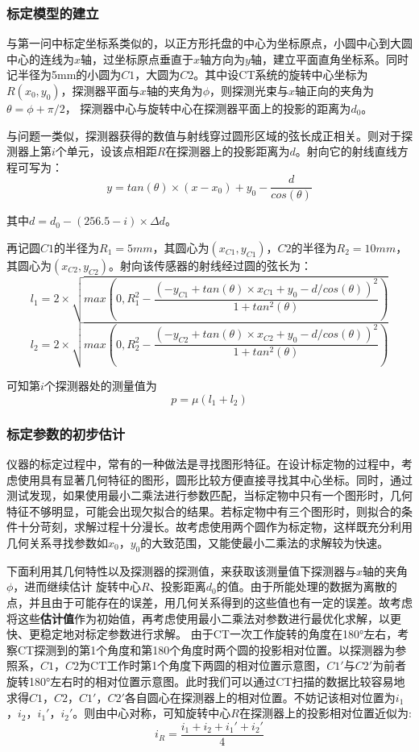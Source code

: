 \documentclass{myart}
\begin{document}

\subsubsection{标定模型的建立}
与第一问中标定坐标系类似的，以正方形托盘的中心为坐标原点，小圆中心到大圆中心的连线为\(x\)轴，过坐标原点垂直于\(x\)轴方向为\(y\)轴，建立平面直角坐标系。同时记半径为5mm的小圆为\(C1\)，大圆为\(C2\)。其中设CT系统的旋转中心坐标为\(R(x_0,y_0)\)，探测器平面与\(x\)轴的夹角为\(\phi\)，则探测光束与\(x\)轴正向的夹角为\( \theta = \phi + \pi /2 \)，  探测器中心与旋转中心在探测器平面上的投影的距离为\(d_0\)。

与问题一类似，探测器获得的数值与射线穿过圆形区域的弦长成正相关。则对于探测器上第\(i\)个单元，设该点相距\(R\)在探测器上的投影距离为\(d\)。射向它的射线直线方程可写为：
\[ y = tan(\theta) \times (x - x_0) + y_0 - \frac{d}{cos(\theta)} \]

其中\(d = d_0 - (256.5 - i) \times \Delta d \)。

再记圆\(C1\)的半径为\(R_1 = 5mm\)，其圆心为\( (x_{C1}, y_{C1} )\)，\(C2\)的半径为\(R_2 = 10mm\)，其圆心为\( (x_{C2}, y_{C2} )\)。射向该传感器的射线经过圆的弦长为：
\[ l_1 = 2\times \sqrt{max(0, R_1^2 - \frac{(-y_{C1} + tan(\theta) \times x_{C1} + y_0 - d/cos(\theta))^2}{1 + tan^2(\theta)})} \]
\[ l_2 = 2\times \sqrt{max(0, R_2^2 - \frac{(-y_{C2} + tan(\theta) \times x_{C2} + y_0 - d/cos(\theta))^2}{1 + tan^2(\theta)})} \]

可知第\(i\)个探测器处的测量值为
\[p = \mu (l_1 + l_2) \]

\subsubsection{标定参数的初步估计}
仪器的标定过程中，常有的一种做法是寻找图形特征。在设计标定物的过程中，考虑使用具有显著几何特征的图形，圆形比较方便直接寻找其中心坐标。同时，通过测试发现，如果使用最小二乘法进行参数匹配，当标定物中只有一个图形时，几何特征不够明显，可能会出现欠拟合的结果。若标定物中有三个图形时，则拟合的条件十分苛刻，求解过程十分漫长。故考虑使用两个圆作为标定物，这样既充分利用几何关系寻找参数如\(x_0\)，\(y_0\)的大致范围，又能使最小二乘法的求解较为快速。

下面利用其几何特性以及探测器的探测值，来获取该测量值下探测器与\(x\)轴的夹角\(\phi\)，进而继续估计  旋转中心\(R\)、投影距离\(d_0\)的值。由于所能处理的数据为离散的点，并且由于可能存在的误差，用几何关系得到的这些值也有一定的误差。故考虑将这些\textbf{估计值}作为初始值，再考虑使用最小二乘法对参数进行最优化求解，以更快、更稳定地对标定参数进行求解。
由于CT一次工作旋转的角度在180°左右，考察CT探测到的第1个角度和第180个角度时两个圆的投影相对位置。以探测器为参照系，\(C1\)，\(C2\)为CT工作时第1个角度下两圆的相对位置示意图，\(C1'\)与\(C2'\)为前者旋转180°左右时的相对位置示意图。此时我们可以通过CT扫描的数据比较容易地求得\(C1\)，\(C2\)，\(C1'\)，\(C2'\)各自圆心在探测器上的相对位置。不妨记该相对位置为\(i_1\)，\(i_2\)，\(i_1'\)，\(i_2'\)。则由中心对称，可知旋转中心\(R\)在探测器上的投影相对位置近似为:
\[ i_R = \frac{i_1 + i_2 + i_1' + i_2'}{4} \]
\end{document}
